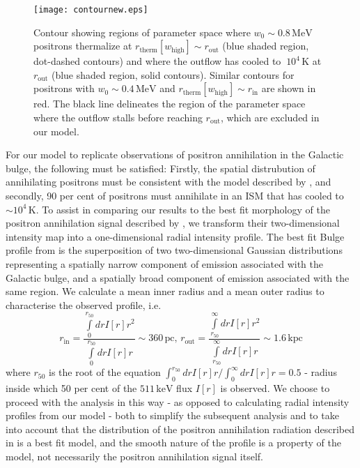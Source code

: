 \documentclass[a4paper,fleqn,usenatbib]{mnras}
\begin{document}
\begin{figure}
	\texttt{[image: contournew.eps]}
	\caption{Contour showing regions of parameter space where $w_0 \sim 0.8\,\mathrm{MeV}$ positrons thermalize at $r_\mathrm{therm}[w_\mathrm{high}]\sim r_\mathrm{out}$ (blue shaded region, dot-dashed contours) and where the outflow has cooled to $~10^4\,\mathrm{K}$ at $r_\mathrm{out}$ (blue shaded region, solid contours). Similar contours for positrons with $w_0 \sim 0.4\,\mathrm{MeV}$ and  $r_\mathrm{therm}[w_\mathrm{high}]\sim r_\mathrm{in}$ are shown in red. The black line delineates the region of the parameter space where the outflow stalls before reaching $r_\mathrm{out}$, which are excluded in our model.}
	\label{fig:contour}
\end{figure}
For our model to replicate observations of positron annihilation in the Galactic bulge, the following must be satisfied: Firstly, the spatial distrubution of annihilating positrons must be consistent with the model described by \cite{Siegert16}, and secondly, 90 per cent of positrons must annihilate in an ISM that has cooled to $\sim 10^4\,\mathrm{K}$. To assist in comparing our results to the best fit morphology of the positron annihilation signal described by \cite{Siegert16}, we transform their two-dimensional intensity map into a one-dimensional radial intensity profile. The best fit Bulge profile from \cite{Siegert16} is the superposition of two two-dimensional Gaussian distributions representing a spatially narrow component of emission associated with the Galactic bulge, and a spatially broad component of emission associated with the same region. We calculate a mean inner radius and a mean outer radius to characterise the observed profile, i.e.
\begin{equation}
r_\mathrm{in} = \frac{\int\limits_{0}^{r_\mathrm{50}}dr I[r]r^2}{\int\limits_{0}^{r_\mathrm{50}} drI[r]r} \sim 360\,\mathrm{pc},\,r_\mathrm{out} = \frac{\int\limits_{r_\mathrm{50}}^{\infty}dr I[r]r^2}{\int\limits_{r_\mathrm{50}}^{\infty} drI[r]r} \sim 1.6\,\mathrm{kpc}
\end{equation}
where $r_\mathrm{50}$ is the root of the equation $\int^{r_\mathrm{50}}_{0}dr I[r]r/\int^{\infty}_{0}dr I[r]r = 0.5$ - radius inside which 50 per cent of the $511\,\mathrm{keV}$ flux $I[r]$ is observed. We choose to proceed with the analysis in this way - as opposed to calculating radial intensity profiles from our model - both to simplify the subsequent analysis and to take into account that the distribution of the positron annihilation radiation described in \cite{Siegert16} is a best fit model, and the smooth nature of the profile is a property of the model, not necessarily the positron annihilation signal itself.\\
\end{document}

